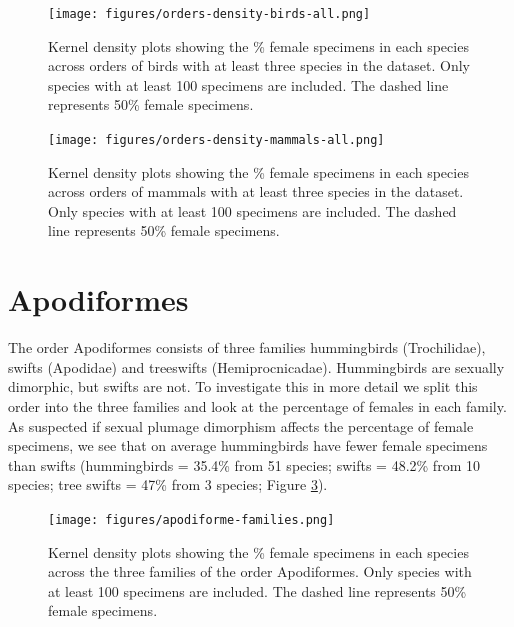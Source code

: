\documentclass[a4paper, 12pt]{article}
\begin{document}
\begin{figure}[H]
 \centering
  \texttt{[image: figures/orders-density-birds-all.png]}
  \caption{Kernel density plots showing the \% female specimens in each species across orders of birds with at least three species in the dataset. 
  Only species with at least 100 specimens are included. 
  The dashed line represents 50\% female specimens.}
  \label{fig-bird-orders}
\end{figure}

\begin{figure}[H]
 \centering
  \texttt{[image: figures/orders-density-mammals-all.png]}
  \caption{Kernel density plots showing the \% female specimens in each species across orders of mammals with at least three species in the dataset. 
  Only species with at least 100 specimens are included. 
  The dashed line represents 50\% female specimens.}
  \label{fig-mammal-orders}
\end{figure}

\newpage


\newpage
\section{Apodiformes}

The order Apodiformes consists of three families hummingbirds (Trochilidae), swifts (Apodidae) and treeswifts (Hemiprocnicadae).
Hummingbirds are sexually dimorphic, but swifts are not. 
To investigate this in more detail we split this order into the three families and look at the percentage of females in each family. 
As suspected if sexual plumage dimorphism affects the percentage of female specimens, we see that on average hummingbirds have fewer female specimens than swifts (hummingbirds = 35.4\% from 51 species; swifts = 48.2\% from 10 species; tree swifts = 47\% from 3 species; Figure \ref{fig-apod}).

\begin{figure}[H]
 \centering
  \texttt{[image: figures/apodiforme-families.png]}
  \caption{Kernel density plots showing the \% female specimens in each species across the three families of the order Apodiformes. 
  Only species with at least 100 specimens are included. 
  The dashed line represents 50\% female specimens. 
}
  \label{fig-apod}
\end{figure}

\newpage
\end{document}
